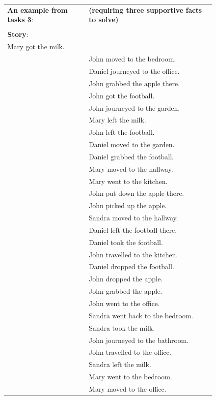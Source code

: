 \begin{figure}[!h]
\label{fig:ex4}
\begin{minipage}{\textwidth}
\fontsize{8}{8}\selectfont
\begin{tabular}{l l}
\textbf{An example from tasks 3}: & \textbf{(requiring three supportive facts to solve)}\\
\\

\textbf{Story}: & \\
Mary got the milk. \\
& John moved to the bedroom. \\
& Daniel journeyed to the office. \\
& John grabbed the apple there. \\
& John got the football. \\
& John journeyed to the garden. \\
& Mary left the milk. \\
& John left the football. \\
& Daniel moved to the garden. \\
& Daniel grabbed the football. \\
& Mary moved to the hallway. \\
& Mary went to the kitchen. \\
& John put down the apple there. \\
& John picked up the apple. \\
& Sandra moved to the hallway. \\
& Daniel left the football there. \\
& Daniel took the football. \\
& John travelled to the kitchen. \\
& Daniel dropped the football. \\
& John dropped the apple. \\
& John grabbed the apple. \\
& John went to the office. \\
& Sandra went back to the bedroom. \\
& Sandra took the milk. \\
& John journeyed to the bathroom. \\
& John travelled to the office. \\
& Sandra left the milk. \\
& Mary went to the bedroom. \\
& Mary moved to the office. \\

\end{tabular}
\end{minipage}
\end{figure}
